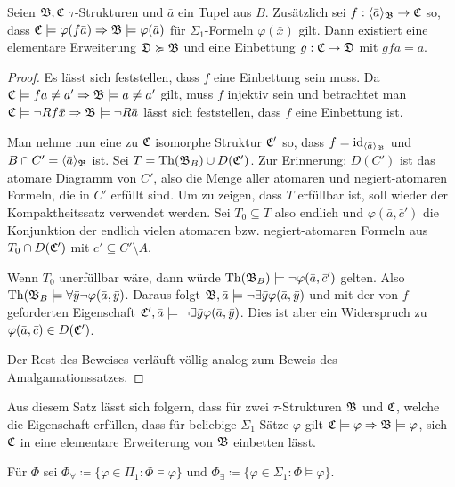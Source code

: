 \begin{satz}
	Seien $\mathfrak{B},\mathfrak{C}$ $\tau$-Strukturen und $\bar{a}$ ein Tupel aus $B$. Zusätzlich sei $f:\langle\bar{a}\rangle_{\mathfrak{B}}\to\mathfrak{C}$ so, dass $\mathfrak{C}\models\varphi(f\bar{a})\Rightarrow\mathfrak{B}\models\varphi(\bar{a})$ für $\Sigma_1$-Formeln $\varphi(\bar{x})$ gilt. Dann existiert eine elementare Erweiterung $\mathfrak{D}\succcurlyeq\mathfrak{B}$ und eine Einbettung $g:\mathfrak{C}\to\mathfrak{D}$ mit $gf\bar{a}=\bar{a}$.
\end{satz}
\begin{proof}
	Es lässt sich feststellen, dass $f$ eine Einbettung sein muss. Da $\mathfrak{C}\models fa\neq a'\Rightarrow \mathfrak{B}\models a\neq a'$ gilt, muss $f$ injektiv sein und betrachtet man $\mathfrak{C}\models\neg Rf\bar{x}\Rightarrow\mathfrak{B}\models\neg R\bar{a}$ lässt sich feststellen, dass $f$ eine Einbettung ist.
	
	Man nehme nun eine zu $\mathfrak{C}$ isomorphe Struktur $\mathfrak{C}'$ so, dass $f=\text{id}_{\langle\bar{a}\rangle_{\mathfrak{B}}}$ und $B\cap C'=\langle\bar{a}\rangle_{\mathfrak{B}}$ ist. Sei $T=\operatorname{Th}(\mathfrak{B}_B)\cup D(\mathfrak{C}')$. Zur Erinnerung: $D(C')$ ist das atomare Diagramm von $C'$, also die Menge aller atomaren und negiert-atomaren Formeln, die in $C'$ erfüllt sind. 
	Um zu zeigen, dass $T$ erfüllbar ist, soll wieder der Kompaktheitssatz verwendet werden. 
	Sei $T_0\subseteq T$ also endlich und $\varphi(\bar{a},\bar{c}')$ die Konjunktion der endlich vielen atomaren bzw. negiert-atomaren Formeln aus $T_0\cap D(\mathfrak{C}')$ mit $c'\subseteq C'\setminus A$.
	
	Wenn $T_0$ unerfüllbar wäre, dann würde $\operatorname{Th}(\mathfrak{B}_B)\models\neg\varphi(\bar{a},\bar{c}')$ gelten. Also $\operatorname{Th}(\mathfrak{B}_B\models\forall\bar{y}\neg\varphi(\bar{a},\bar{y})$. Daraus folgt $\mathfrak{B},\bar{a}\models\neg\exists\bar{y}\varphi(\bar{a},\bar{y})$ und mit der von $f$ geforderten Eigenschaft $\mathfrak{C}',\bar{a}\models\neg\exists\bar{y}\varphi(\bar{a},\bar{y})$. Dies ist aber ein Widerspruch zu $\varphi(\bar{a},\bar{c})\in D(\mathfrak{C}')$.
	
	Der Rest des Beweises verläuft völlig analog zum Beweis des Amalgamationssatzes.
 \end{proof}
 
 Aus diesem Satz lässt sich folgern, dass für zwei $\tau$-Strukturen $\mathfrak{B}$ und $\mathfrak{C}$, welche die Eigenschaft erfüllen, dass für beliebige $\Sigma_1$-Sätze $\varphi$ gilt $\mathfrak{C}\models\varphi\Rightarrow\mathfrak{B}\models\varphi$, sich $\mathfrak{C}$ in eine elementare Erweiterung von $\mathfrak{B}$ einbetten lässt.

\begin{definition}
	Für $\Phi$ sei $\Phi_\forall\coloneqq\{\varphi\in\Pi_1 : \Phi\models\varphi\}$ und $\Phi_\exists\coloneqq\{\varphi\in\Sigma_1 : \Phi\models\varphi\}$.
\end{definition}


